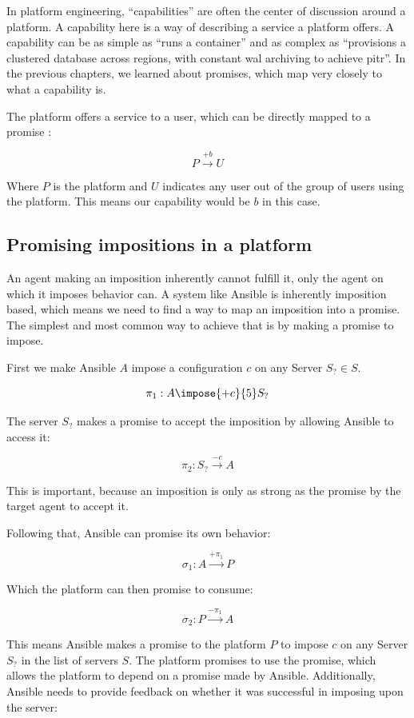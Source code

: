 In platform engineering, \enquote{capabilities} are often the center of discussion around a platform.
A capability here is a way of describing a service a platform offers.
A capability can be as simple as \enquote{runs a container} and as complex as \enquote{provisions a clustered database across regions, with constant \gls{wal} archiving to achieve \gls{pitr}}.
In the previous chapters, we learned about promises, which map very closely to what a capability is.
\parencite{platformengineering-architects, cncfPlatformEngineering}
\par
The platform offers a service to a user, which can be directly mapped to a promise \parencite{promise-theory}:

\[ P \xrightarrow{+b} U \]

Where $P$ is the platform and $U$ indicates any user out of the group of users using the platform.
This means our capability would be $b$ in this case.

\subsection{Promising impositions in a platform}
An agent making an imposition inherently cannot fulfill it, only the agent on which it imposes behavior can.
A system like Ansible is inherently imposition based, which means we need to find a way to map an imposition into a promise.
The simplest and most common way to achieve that is by making a promise to impose.
\parencite{promise-theory}

First we make Ansible $A$ impose a configuration $c$ on any Server $S_?
	\in S$.

\[ \pi _1: A \impose{+c}{5}
	S_?
\]

The server $S_?
$ makes a promise to accept the imposition by allowing Ansible to access it:

\[ \pi _2: S_? \xrightarrow{-c}
	A \]

This is important, because an imposition is only as strong as the promise by the target agent to accept it.
\parencite{promise-theory}
\par
Following that, Ansible can promise its own behavior:

\[ \sigma _1: A \xrightarrow{+\pi _1} P \]

Which the platform can then promise to consume:

\[ \sigma _2: P \xrightarrow{-\pi _1} A \]

This means Ansible makes a promise to the platform $P$ to impose $c$ on any Server $S_?
$ in the list of servers $S$.
The platform promises to use the promise, which allows the platform to depend on a promise made by Ansible.
Additionally, Ansible needs to provide feedback on whether it was successful in imposing upon the server:

